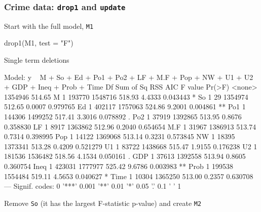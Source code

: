 \documentclass[a4paper]{article}\usepackage[]{graphicx}\usepackage[]{xcolor}
\begin{document}
\subsubsection{Crime data: \lstinline|drop1| and \lstinline|update|}
Start with the full model, \lstinline|M1|
\begin{Schunk}
\begin{Sinput}
drop1(M1, test = "F")
\end{Sinput}
\begin{Soutput}
Single term deletions

Model:
y ~ M + So + Ed + Po1 + Po2 + LF + M.F + Pop + NW + U1 + U2 + 
    GDP + Ineq + Prob + Time
       Df Sum of Sq     RSS    AIC F value   Pr(>F)   
<none>              1354946 514.65                    
M       1    193770 1548716 518.93  4.4333 0.043443 * 
So      1        29 1354974 512.65  0.0007 0.979765   
Ed      1    402117 1757063 524.86  9.2001 0.004861 **
Po1     1    144306 1499252 517.41  3.3016 0.078892 . 
Po2     1     37919 1392865 513.95  0.8676 0.358830   
LF      1      8917 1363862 512.96  0.2040 0.654654   
M.F     1     31967 1386913 513.74  0.7314 0.398995   
Pop     1     14122 1369068 513.14  0.3231 0.573845   
NW      1     18395 1373341 513.28  0.4209 0.521279   
U1      1     83722 1438668 515.47  1.9155 0.176238   
U2      1    181536 1536482 518.56  4.1534 0.050161 . 
GDP     1     37613 1392558 513.94  0.8605 0.360754   
Ineq    1    423031 1777977 525.42  9.6786 0.003983 **
Prob    1    199538 1554484 519.11  4.5653 0.040627 * 
Time    1     10304 1365250 513.00  0.2357 0.630708   
---
Signif. codes:  0 '***' 0.001 '**' 0.01 '*' 0.05 '.' 0.1 ' ' 1
\end{Soutput}
\end{Schunk}
Remove \lstinline|So| (it has the largest F-statistic p-value) and create \lstinline|M2|
\end{document}
